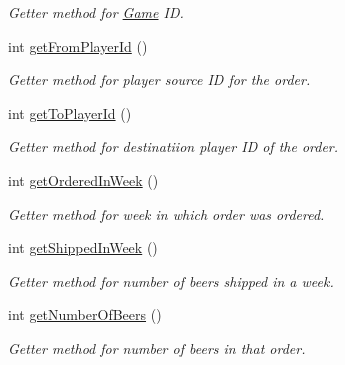 \begin{DoxyCompactItemize}
\begin{DoxyCompactList}\small\item\em Getter method for \hyperlink{class_game}{Game} ID. \end{DoxyCompactList}\item 
int \hyperlink{class_order_a1d6ae1f551053272307fde77c2cffa58}{get\+From\+Player\+Id} ()
\begin{DoxyCompactList}\small\item\em Getter method for player source ID for the order. \end{DoxyCompactList}\item 
int \hyperlink{class_order_a212e8294656ab9582dbca89de2e1e4c9}{get\+To\+Player\+Id} ()
\begin{DoxyCompactList}\small\item\em Getter method for destinatiion player ID of the order. \end{DoxyCompactList}\item 
int \hyperlink{class_order_aed0ea4435169c95ecc05530df91f225a}{get\+Ordered\+In\+Week} ()
\begin{DoxyCompactList}\small\item\em Getter method for week in which order was ordered. \end{DoxyCompactList}\item 
int \hyperlink{class_order_a7103f60141cf2fefd053aac011dc7613}{get\+Shipped\+In\+Week} ()
\begin{DoxyCompactList}\small\item\em Getter method for number of beers shipped in a week. \end{DoxyCompactList}\item 
int \hyperlink{class_order_a88e86300e6c1b4a21e4ea042b60a7220}{get\+Number\+Of\+Beers} ()
\begin{DoxyCompactList}\small\item\em Getter method for number of beers in that order. \end{DoxyCompactList}\end{DoxyCompactItemize}
